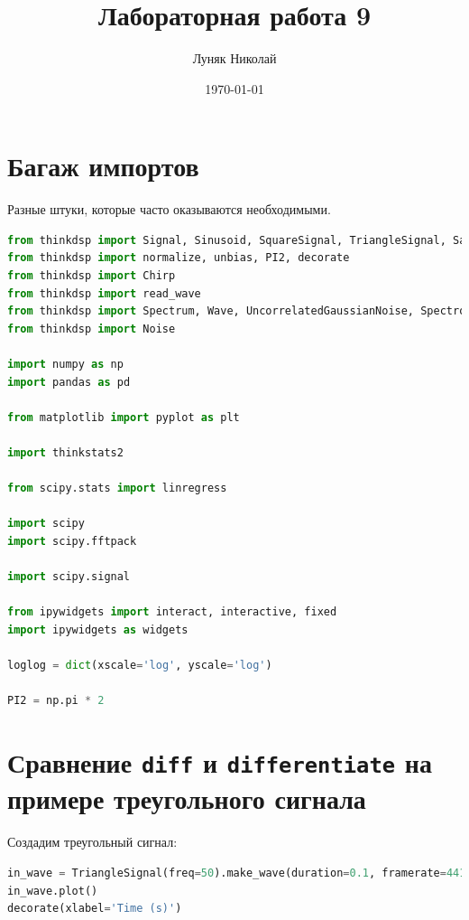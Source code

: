 \documentclass[a4paper,12pt]{report}
\author{Луняк Николай}
\title{Лабораторная работа 9}
\date{\today}
\begin{document}
    \maketitle
    \tableofcontents
    \listoffigures
    \lstlistoflistings
    
    \chapter{Багаж импортов}
    
    Разные штуки, которые часто оказываются необходимыми.
    
\begin{lstlisting}[language=Python,caption=Импорты]
from thinkdsp import Signal, Sinusoid, SquareSignal, TriangleSignal, SawtoothSignal, ParabolicSignal
from thinkdsp import normalize, unbias, PI2, decorate
from thinkdsp import Chirp
from thinkdsp import read_wave
from thinkdsp import Spectrum, Wave, UncorrelatedGaussianNoise, Spectrogram
from thinkdsp import Noise

import numpy as np
import pandas as pd

from matplotlib import pyplot as plt

import thinkstats2

from scipy.stats import linregress

import scipy
import scipy.fftpack

import scipy.signal

from ipywidgets import interact, interactive, fixed
import ipywidgets as widgets

loglog = dict(xscale='log', yscale='log')

PI2 = np.pi * 2
\end{lstlisting}

    \chapter{Сравнение \texttt{diff} и \texttt{differentiate} на примере треугольного сигнала}

    Создадим треугольный сигнал:
    
\begin{lstlisting}[language=Python,caption=Создаем треугольный сигнал]
in_wave = TriangleSignal(freq=50).make_wave(duration=0.1, framerate=44100)
in_wave.plot()
decorate(xlabel='Time (s)')
\end{lstlisting}
\end{document}
